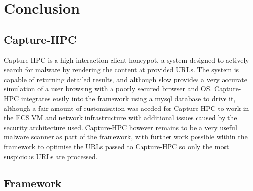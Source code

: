 \section{Conclusion} 
 


\subsection{Capture-HPC}
Capture-HPC is a high interaction client honeypot, a system designed to actively
search for malware by rendering the content at provided URLs. The system is
capable of returning detailed results, and although slow provides a very
accurate simulation of a user browsing with a poorly secured browser and OS.
Capture-HPC integrates easily into the framework using a mysql database to drive
it, although a fair amount of customisation was needed for Capture-HPC to work
in the ECS VM and network infrastructure with additional issues caused by the
security architecture used. Capture-HPC however remains to be a very useful
malware scanner as part of the framework, with further work possible within the
framework to optimise the URLs passed to Capture-HPC so only the most suspicious
URLs are processed. 

\subsection{Framework}

